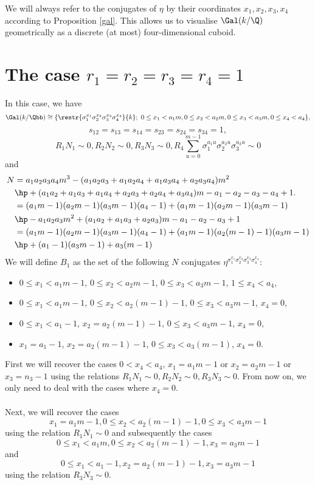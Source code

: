 We will always refer to the conjugates of $\eta$ by their coordinates $x_1,x_2,x_3,x_4$ according to Proposition \ref{gal}. This allows us to visualise $\Gal(k/\Q)$ geometrically as a discrete (at most) four-dimensional cuboid.

\section{The case $r_1=r_2=r_3=r_4=1$}\label{bases1}
In this case, we have
$$\Gal(k/\Qbb)\cong
 \{\restr{\sigma_1^{x_1}\sigma_2^{x_2}\sigma_3^{x_3}\sigma_4^{x_4}}{k};~  0\leq x_1<a_1m, 0\leq x_2<a_2m, 0\leq x_3<a_3m,0\leq x_4<a_4\},$$
 $$s_{12}=s_{13}=s_{14}=s_{23}=s_{24}=s_{34}=1,$$
$$R_1N_1\sim 0, R_2N_2\sim 0, R_3N_3 \sim 0, R_4 \sum_{u=0}^{m-1}\sigma_1^{a_1u}\sigma_2^{a_2u}\sigma_3^{a_3u} \sim 0$$
and
\begin{align*}
N&=a_1a_2a_3a_4m^3-(a_1a_2a_3+a_1a_2a_4+a_1a_3a_4+a_2a_3a_4)m^2\\
&\hp+(a_1a_2+a_1a_3+a_1a_4+a_2a_3+a_2a_4+a_3a_4)m-a_1-a_2-a_3-a_4+1.\\
&=(a_1m-1)(a_2m-1)(a_3m-1)(a_4-1)+(a_1m-1)(a_2m-1)(a_3m-1)\\
&\hp-a_1a_2a_3m^2+(a_1a_2+a_1a_3+a_2a_3)m-a_1-a_2-a_3+1\\
&=(a_1m-1)(a_2m-1)(a_3m-1)(a_4-1)+(a_1m-1)(a_2(m-1)-1)(a_3m-1)\\
&\hp+(a_1-1)(a_3m-1)+a_3(m-1)
\end{align*}
We will define $B_1$ as the set of the following $N$ conjugates $\eta^{\sigma_1^{x_1}\sigma_2^{x_2}\sigma_3^{x_3}\sigma_4^{x_4}}$:

\begin{itemize}
\item $0\le x_1 <a_1m-1$, $0\le x_2 < a_2m-1$, $ 0 \le x_3<a_3m-1$, $ 1\le x_4<a_4$,
\item $0 \le x_1 <a_1m-1$, $0\le x_2 < a_2(m-1)-1$, $0 \le x_3<a_3m-1$, $ x_4=0$,
\item $0\le x_1 < a_1-1$, $ x_2 =a_2(m-1)-1$, $ 0\leq x_3 < a_3m-1$, $ x_4=0$,
\item $x_1=a_1-1$, $ x_2 =a_2(m-1)-1$, $ 0\leq x_3 < a_3(m-1)$, $ x_4=0$.
\end{itemize}

First we will recover the cases $0<x_4<a_4$, $x_1=a_1m-1$ or $x_2=a_2m-1$ or $x_3=n_3-1$ using the relations $R_1N_1\sim 0, R_2N_2\sim 0, R_3N_3\sim 0$. From now on, we only need to deal with the cases where $x_4=0$.
\paragraph*{}
Next, we will recover the cases $$x_1=a_1m-1, 0\le x_2 < a_2(m-1)-1, 0\leq x_3 <a_3m-1$$ using the relation $R_1N_1\sim 0$ and subsequently the cases $$0\leq x_1 < a_1m,  0\le x_2 < a_2(m-1)-1, x_3 = a_3m-1$$ and $$0\le x_1 < a_1-1, x_2 = a_2(m-1)-1, x_3 = a_3m-1$$ using the relation $R_3N_3\sim 0$.


